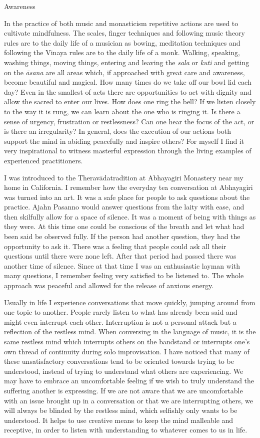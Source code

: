 Awareness

In the practice of both music and monasticism repetitive actions are
used to cultivate mindfulness. The scales, finger techniques and
following music theory rules are to the daily life of a musician as
bowing, meditation techniques and following the Vinaya rules are to the
daily life of a monk. Walking, speaking, washing things, moving things,
entering and leaving the \emph{sala} or \emph{kuti} and getting on the
\emph{āsana} are all areas which, if approached with great care and
awareness, become beautiful and magical. How many times do we take off
our bowl lid each day? Even in the smallest of acts there are
opportunities to act with dignity and allow the sacred to enter our
lives. How does one ring the bell? If we listen closely to the way it is
rung, we can learn about the one who is ringing it. Is there a sense of
urgency, frustration or restlessness? Can one hear the focus of the act,
or is there an irregularity? In general, does the execution of our
actions both support the mind in abiding peacefully and inspire others?
For myself I find it very inspirational to witness masterful expression
through the living examples of experienced practitioners.

I was introduced to the Theravāda‎tradition at Abhayagiri Monastery near
my home in California. I remember how the everyday tea conversation at
Abhayagiri was turned into an art. It was a safe place for people to ask
questions about the practice. Ajahn Pasanno would answer questions from
the laity with ease, and then skilfully allow for a space of silence. It
was a moment of being with things as they were. At this time one could
be conscious of the breath and let what had been said be observed fully.
If the person had another question, they had the opportunity to ask it.
There was a feeling that people could ask all their questions until
there were none left. After that period had passed there was another
time of silence. Since at that time I was an enthusiastic layman with
many questions, I remember feeling very satisfied to be listened to. The
whole approach was peaceful and allowed for the release of anxious
energy.

Usually in life I experience conversations that move quickly, jumping
around from one topic to another. People rarely listen to what has
already been said and might even interrupt each other. Interruption is
not a personal attack but a reflection of the restless mind. When
conversing in the language of music, it is the same restless mind which
interrupts others on the bandstand or interrupts one's own thread of
continuity during solo improvisation. I have noticed that many of these
unsatisfactory conversations tend to be oriented towards trying to be
understood, instead of trying to understand what others are
experiencing. We may have to embrace an uncomfortable feeling if we wish
to truly understand the suffering another is expressing. If we are not
aware that we are uncomfortable with an issue brought up in a
conversation or that we are interrupting others, we will always be
blinded by the restless mind, which selfishly only wants to be
understood. It helps to use creative means to keep the mind malleable
and receptive, in order to listen with understanding to whatever comes
to us in life.

